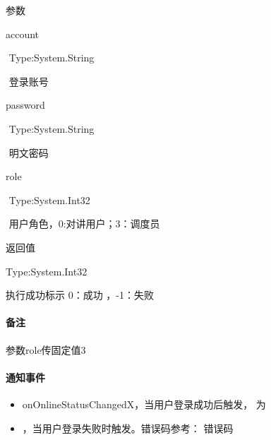 \documentclass[letterpaper,10pt,english]{sphinxmanual}
\begin{document}
参数

account

​ Type:System.String

​ 登录账号

password

​ Type:System.String

​ 明文密码

role

​ Type:System.Int32

​ 用户角色，0:对讲用户；3：调度员

返回值

Type:System.Int32

执行成功标示 0：成功 ，-1：失败


\paragraph{备注}
\label{\detokenize{csharp_activex:id14}}
参数role传固定值3


\paragraph{通知事件}
\label{\detokenize{csharp_activex:id15}}\begin{itemize}
\item {} 
onOnlineStatusChangedX，当用户登录成功后触发， 为

\item {} 
，当用户登录失败时触发。错误码参考： 错误码

\end{itemize}
\end{document}
